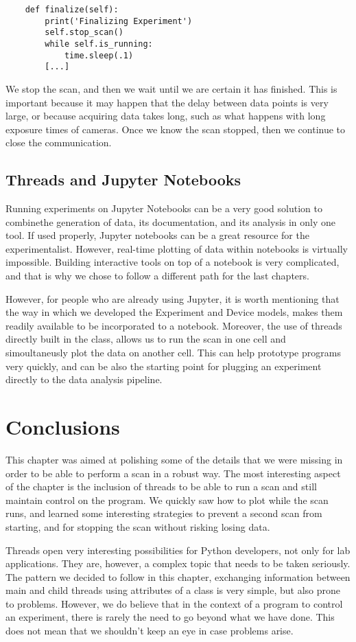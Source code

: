 \begin{verbatim}
    def finalize(self):
        print('Finalizing Experiment')
        self.stop_scan()
        while self.is_running:
            time.sleep(.1)
        [...]
\end{verbatim}

We stop the scan, and then we wait until we are certain it has finished. This is important because it may happen that the delay between data points is very large, or because acquiring data takes long, such as what happens with long exposure times of cameras. Once we know the scan stopped, then we continue to close the communication.

\subsection{Threads and Jupyter Notebooks}\label{subsection:Jupyter}
Running experiments on Jupyter Notebooks can be a very good solution to combinethe generation of data, its documentation, and its analysis in only one tool. If used properly, Jupyter notebooks can be a great resource for the experimentalist. However, real-time plotting of data within notebooks is virtually impossible. Building interactive tools on top of a notebook is very complicated, and that is why we chose to follow a different path for the last chapters.

However, for people who are already using Jupyter, it is worth mentioning that the way in which we developed the Experiment and Device models, makes them readily available to be incorporated to a notebook. Moreover, the use of threads directly built in the class, allows us to run the scan in one cell and simoultaneusly plot the data on another cell. This can help prototype programs very quickly, and can be also the starting point for plugging an experiment directly to the data analysis pipeline.

\section{Conclusions}\label{section:conclusions-run-experiment}
This chapter was aimed at polishing some of the details that we were missing in order to be able to perform a scan in a robust way. The most interesting aspect of the chapter is the inclusion of threads to be able to run a scan and still maintain control on the program. We quickly saw how to plot while the scan runs, and learned some interesting strategies to prevent a second scan from starting, and for stopping the scan without risking losing data.

Threads open very interesting possibilities for Python developers, not only for lab applications. They are, however, a complex topic that needs to be taken seriously. The pattern we decided to follow in this chapter, exchanging information between main and child threads using attributes of a class is very simple, but also prone to problems. However, we do believe that in the context of a program to control an experiment, there is rarely the need to go beyond what we have done. This does not mean that we shouldn't keep an eye in case problems arise.
